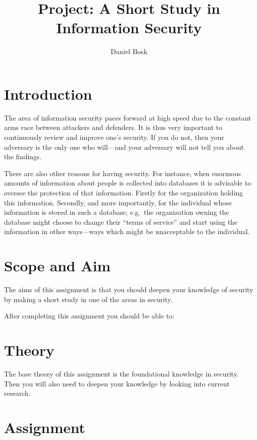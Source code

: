 \documentclass[a4paper]{llncs}
\title{Project: A Short Study in Information Security}
\author{%
  Daniel Bosk
}
\institute{%
  Department of Information and Communication Systems\\
  Mid Sweden University, Sundsvall
}
\begin{document}
\maketitle


\section{Introduction}%
\label{sec:intro}

The area of information security paces forward at high speed due to the 
constant arms race between attackers and defenders.
It is thus very important to continuously review and improve one's security.
If you do not, then your adversary is the only one who will---and your 
adversary will not tell you about the findings.

There are also other reasons for having security.
For instance, when enormous amounts of information about people is collected 
into databases it is advisable to oversee the protection of that information.
Firstly for the organization holding this information.
Secondly, and more importantly, for the individual whose information is stored 
in such a database; e.g.~the organization owning the database might choose to 
change their \enquote{terms of service} and start using the information in 
other ways---ways which might be unacceptable to the individual.


\section{Scope and Aim}%
\label{sec:goal}

The aims of this assignment is that you should deepen your knowledge of 
security by making a short study in one of the areas in security.

After completing this assignment you should be able to:
\begin{itemize}
	
\end{itemize}


\section{Theory}

The base theory of this assignment is the foundational knowledge in security.
Then you will also need to deepen your knowledge by looking into current 
research.


\section{Assignment}%
\label{sec:work}
\end{document}
